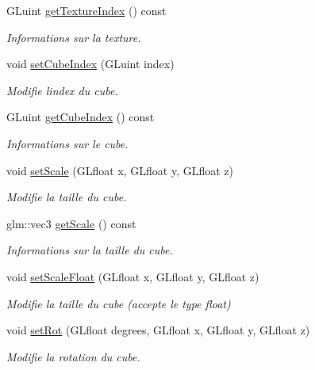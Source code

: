 \begin{DoxyCompactItemize}
G\+Luint \hyperlink{classglimac_1_1Cube_abc2b501d1c7d60770ebcd707c001635b}{get\+Texture\+Index} () const
\begin{DoxyCompactList}\small\item\em Informations sur la texture. \end{DoxyCompactList}\item 
void \hyperlink{classglimac_1_1Cube_aa98b9f6d9554e658643eac25815b0b02}{set\+Cube\+Index} (G\+Luint index)
\begin{DoxyCompactList}\small\item\em Modifie l\textquotesingle{}index du cube. \end{DoxyCompactList}\item 
G\+Luint \hyperlink{classglimac_1_1Cube_a743bc4c8de7cb3422dc1ba3edc769771}{get\+Cube\+Index} () const
\begin{DoxyCompactList}\small\item\em Informations sur le cube. \end{DoxyCompactList}\item 
void \hyperlink{classglimac_1_1Cube_ac79f2d273f24a4ff19c78e6e3e55221a}{set\+Scale} (G\+Lfloat x, G\+Lfloat y, G\+Lfloat z)
\begin{DoxyCompactList}\small\item\em Modifie la taille du cube. \end{DoxyCompactList}\item 
glm\+::vec3 \hyperlink{classglimac_1_1Cube_a8364cfaa27d1414f102248c420ea962a}{get\+Scale} () const
\begin{DoxyCompactList}\small\item\em Informations sur la taille du cube. \end{DoxyCompactList}\item 
void \hyperlink{classglimac_1_1Cube_a846bf811b0634b6e353cb24b73d7bd71}{set\+Scale\+Float} (G\+Lfloat x, G\+Lfloat y, G\+Lfloat z)
\begin{DoxyCompactList}\small\item\em Modifie la taille du cube (accepte le type float) \end{DoxyCompactList}\item 
void \hyperlink{classglimac_1_1Cube_af89fa188e904dd7db6ebccff5f4c3f4f}{set\+Rot} (G\+Lfloat degrees, G\+Lfloat x, G\+Lfloat y, G\+Lfloat z)
\begin{DoxyCompactList}\small\item\em Modifie la rotation du cube. \end{DoxyCompactList}\item 

\end{DoxyCompactItemize}

